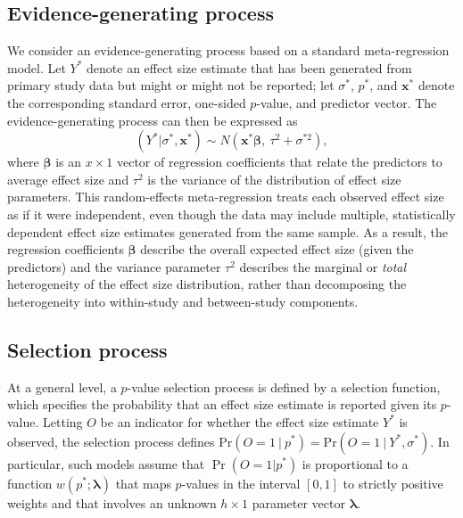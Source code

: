 \documentclass[
  american,
  man, donotrepeattitle,floatsintext]{apa7}
\begin{document}
\subsection{Evidence-generating process}\label{evidence-generating-process}

We consider an evidence-generating process based on a standard meta-regression model.
Let \(Y^*\) denote an effect size estimate that has been generated from primary study data but might or might not be reported; let \(\sigma^*\), \(p^*\), and \(\mathbf{x}^*\) denote the corresponding standard error, one-sided \(p\)-value, and predictor vector.
The evidence-generating process can then be expressed as
\begin{equation}
\label{eq:meta-mean-regression}
\left(Y^* | \sigma^*, \mathbf{x}^*\right) \sim N\left(\mathbf{x}^* \boldsymbol\beta, \ \tau^2 + \sigma^{*2}\right),
\end{equation}
where \(\boldsymbol\beta\) is an \(x \times 1\) vector of regression coefficients that relate the predictors to average effect size and \(\tau^2\) is the variance of the distribution of effect size parameters.
This random-effects meta-regression treats each observed effect size as if it were independent, even though the data may include multiple, statistically dependent effect size estimates generated from the same sample.
As a result, the regression coefficients \(\boldsymbol\beta\) describe the overall expected effect size (given the predictors) and the variance parameter \(\tau^2\) describes the marginal or \emph{total} heterogeneity of the effect size distribution, rather than decomposing the heterogeneity into within-study and between-study components.

\subsection{Selection process}\label{selection-process}

At a general level, a \(p\)-value selection process is defined by a selection function, which specifies the probability that an effect size estimate is reported given its \(p\)-value.
Letting \(O\) be an indicator for whether the effect size estimate \(Y^*\) is observed, the selection process defines \(\text{Pr}(O = 1 \ | \ p^*) = \text{Pr}(O = 1 \ | \ Y^*, \sigma^*)\).
In particular, such models assume that
\(\Pr\left(O = 1 | p^* \right)\) is proportional to a function \(w\left(p^*; \boldsymbol\lambda \right)\) that maps \(p\)-values in the interval \([0,1]\) to strictly positive weights and that involves an unknown \(h \times 1\) parameter vector \(\boldsymbol\lambda\).
\end{document}

